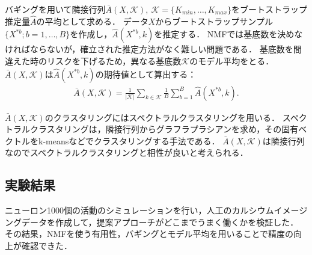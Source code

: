 \documentclass[
  11pt, %
  twocolumn, %
  headings=small, %
]{scrartcl}
\begin{document}
バギングを用いて隣接行列$\bar{A}(X, \mathcal{K}), \ \mathcal{K} = \{K_{min}, \dots, K_{max}\}$をブートストラップ推定量$\hat{A}$の平均として求める．
データ$X$からブートストラップサンプル$\{X^{*b}; b = 1,\dots, B\}$を作成し，$\hat{A}(X^{*b},k)$を推定する．
NMFでは基底数を決めなければならないが，確立された推定方法がなく難しい問題である．
基底数を間違えた時のリスクを下げるため，異なる基底数$\mathcal{K}$のモデル平均をとる．
$\bar{A}(X, \mathcal{K})$は$\hat{A}(X^{*b},k)$の期待値として算出する：
\begin{align}
	\bar{A}(X,\mathcal{K}) = \frac{1}{|\mathcal{K}|} \sum_{k \in \mathcal{K}} \frac{1}{B} \sum_{b=1}^B \hat{A}(X^{*b}, k).
\end{align}

$\bar{A}(X, \mathcal{K})$のクラスタリングにはスペクトラルクラスタリングを用いる．
スペクトラルクラスタリングは，隣接行列からグラフラプラシアンを求め，その固有ベクトルをk-meansなどでクラスタリングする手法である．
$\bar{A}(X, \mathcal{K})$は隣接行列なのでスペクトラルクラスタリングと相性が良いと考えられる．
\subsection*{実験結果}
ニューロン1000個の活動のシミュレーションを行い，人工のカルシウムイメージングデータを作成して，提案アプローチがどこまでうまく働くかを検証した．
その結果，NMFを使う有用性，バギングとモデル平均を用いることで精度の向上が確認できた．
\end{document}
